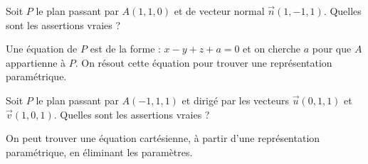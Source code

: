 \begin{question} 
Soit $P$ le plan passant par $A(1,1,0)$ et  de vecteur normal $\vec{n}(1,-1,1)$. Quelles sont les assertions vraies ?
\begin{answers}



   
\end{answers}
\begin{explanations}
Une équation de $P$ est de la forme : $x-y+z+a=0$ et on cherche $a$ pour que $A$ appartienne à $P$. On résout cette équation pour trouver une représentation paramétrique. 
\end{explanations}

\end{question}

\begin{question} 
Soit $P$ le plan passant par $A(-1,1,1)$ et dirigé par les vecteurs
 $\vec{u}(0,1,1)$ et $\vec{v}(1,0,1)$. Quelles sont les assertions vraies ?
\begin{answers}


 
    
    
     
   
\end{answers}
\begin{explanations}
On peut trouver une équation cartésienne, à partir d'une représentation paramétrique,  en éliminant les paramètres.
\end{explanations}

\end{question}


